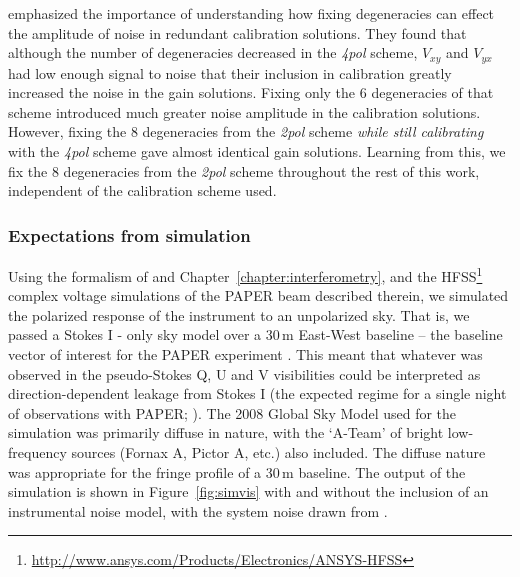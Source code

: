 \citet{Dillon.17} emphasized the importance of understanding how fixing degeneracies can effect the amplitude of noise in redundant calibration solutions. They found that although the number of degeneracies decreased in the \textit{4pol} scheme, $V_{xy}$ and $V_{yx}$ had low enough signal to noise that their inclusion in calibration greatly increased the noise in the gain solutions. Fixing only the 6 degeneracies of that scheme introduced much greater noise amplitude in the calibration solutions. However, fixing the 8 degeneracies from the \textit{2pol} scheme \textit{while still calibrating} with the \textit{4pol} scheme gave almost identical gain solutions. Learning from this, we fix the 8 degeneracies from the \textit{2pol} scheme throughout the rest of this work, independent of the calibration scheme used.

\subsubsection{Expectations from simulation}  

Using the formalism of \cite{Nunhokee.17} and Chapter~\ref{chapter:interferometry}, and the HFSS\footnote{\url{http://www.ansys.com/Products/Electronics/ANSYS-HFSS}} complex voltage simulations of the PAPER beam described therein, we simulated the polarized response of the instrument to an unpolarized sky. That is, we passed a Stokes I - only sky model \citep[][]{GSM.08} over a 30\,m East-West baseline -- the baseline vector of interest for the PAPER experiment \citep{Parsons.14, Jacobs.15, Ali.15, Moore.17}. This meant that whatever was observed in the pseudo-Stokes Q, U and V visibilities could be interpreted as direction-dependent leakage from Stokes I (the expected regime for a single night of observations with PAPER; \citet{Kohn.16}). The 2008 Global Sky Model used for the simulation was primarily diffuse in nature, with the `A-Team' of bright low-frequency sources (Fornax A, Pictor A, etc.) also included. The diffuse nature was appropriate for the fringe profile of a 30\,m baseline. The output of the simulation is shown in Figure~\ref{fig:simvis} with and without the inclusion of an instrumental noise model, with the system noise drawn from \cite{Moore.17}.

